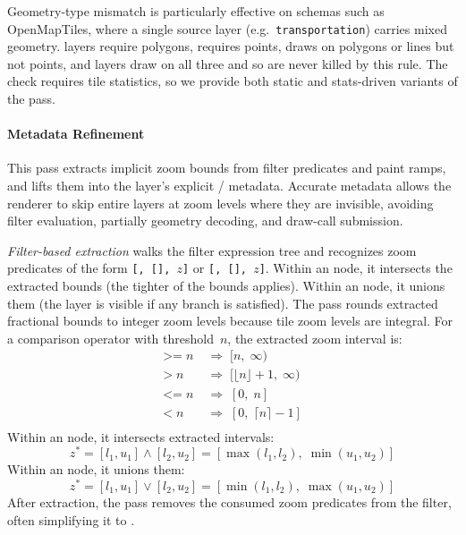 Geometry-type mismatch is particularly effective on schemas such as OpenMapTiles, where a single source layer (e.g.\ \texttt{transportation}) carries mixed geometry. \texttt{} layers require polygons, \texttt{} requires points, \texttt{} draws on polygons or lines but not points, and \texttt{} layers draw on all three and so are never killed by this rule.
The check requires tile statistics, so we provide both static and stats-driven variants of the pass.

\paragraph{Metadata Refinement}
This pass extracts implicit zoom bounds from filter predicates and paint ramps, and lifts them into the layer's explicit /  metadata.
Accurate metadata allows the renderer to skip entire layers at zoom levels where they are invisible, avoiding filter evaluation, partially geometry decoding, and draw-call submission.

\emph{Filter-based extraction} walks the filter expression tree and recognizes zoom predicates of the form \texttt{[,~[],~$z$]} or \texttt{[,~[],~$z$]}.
Within an  node, it intersects the extracted bounds (the tighter of the bounds applies).
Within an  node, it unions them (the layer is visible if any branch is satisfied).
The pass rounds extracted fractional bounds to integer zoom levels because tile zoom levels are integral.
For a comparison operator with threshold~$n$, the extracted zoom interval is:
\begin{equation}\label{eq:zoom_bounds}
    \begin{aligned}
        \texttt{>=}\; n &\;\Rightarrow\; [n,\;\infty) \\
        \texttt{>}\; n  &\;\Rightarrow\; [\lfloor n \rfloor + 1,\;\infty) \\
        \texttt{<=}\; n &\;\Rightarrow\; [0,\; n]\\
        \texttt{<}\; n  &\;\Rightarrow\; [0,\; \lceil n \rceil - 1] \\
    \end{aligned}
\end{equation}
Within an  node, it intersects extracted intervals:
\[
z^{*} = [l_1, u_1] \land [l_2, u_2] = [\max(l_1, l_2),\; \min(u_1, u_2)]
\]
Within an  node, it unions them:
\[
z^{*} = [l_1, u_1] \lor [l_2, u_2] = [\min(l_1, l_2),\; \max(u_1, u_2)]
\]
After extraction, the pass removes the consumed zoom predicates from the filter, often simplifying it to .

